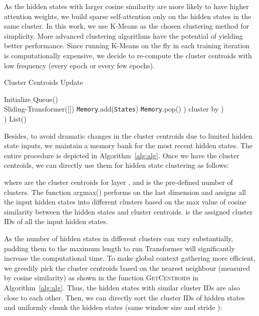 \documentclass[11pt,a4paper]{article}
\newcommand{\vars}{\texttt}
\newcommand{\func}{\textrm}
\begin{document}
As the hidden states with larger cosine similarity are more likely to have higher attention weights, we build sparse self-attention only on the hidden states in the same cluster.
In this work, we use K-Means as the chosen clustering method for simplicity. More advanced clustering algorithms have the potential of yielding better performance.
Since running K-Means on the fly in each training iteration is computationally expensive, we decide to re-compute the cluster centroids with low frequency (every epoch or every few epochs).

\begin{algorithm}[t]
\small
\caption{Cluster Centroids Update}
\label{alg:alg}
\begin{algorithmic}[1]
\State Initialize  Queue()
\State  \\


  \State  \func{Sliding-Transformer}([])
\State \vars{Memory}.add(\vars{States})
  \While{len(\vars{Memory})  M}
  \State \vars{Memory}.pop()
  \EndWhile
{} \;
\State )
  \EndIf
  \State  cluster  by 
  \State )
  \EndFor
\EndFunction \\

  \State )
  \State  List()
  \State [1] [1]
\State{}
\EndFor
  \State \Return 
\EndFunction
\end{algorithmic}
\end{algorithm}

Besides, to avoid dramatic changes in the cluster centroids due to limited hidden state inputs, we maintain a memory bank for the most recent hidden states. The entire procedure is depicted in Algorithm~\ref{alg:alg}.
Once we have the cluster centroids, we can directly use them for hidden state clustering as follows:

where  are the cluster centroids for layer , and  is the pre-defined number of clusters.
The function argmax() performs on the last dimension and assigns all the input hidden states into different clusters based on the max value of cosine similarity between the hidden states and cluster centroids.
 is the assigned cluster IDs of all the input hidden states.

As the number of hidden states in different clusters can vary substantially, padding them to the  maximum length to run Transformer will significantly increase the computational time.
To make global context gathering more efficient, we greedily pick the cluster centroids based on the nearest neighbour (measured by cosine similarity) as shown in the function \textsc{GetCentroids} in Algorithm~\ref{alg:alg}.
Thus, the hidden states with similar cluster IDs are also close to each other.
Then, we can directly sort the cluster IDs of hidden states and uniformly chunk the hidden states (same window size and stride ):
\end{document}
